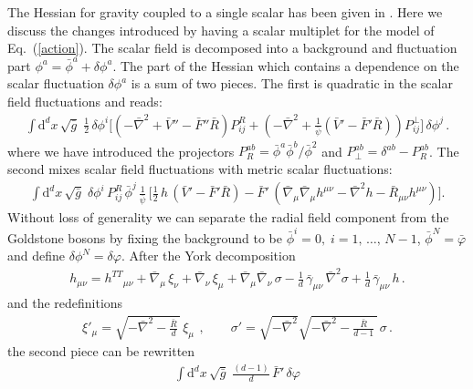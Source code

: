 \documentclass[11pt]{book} %
\newcommand{\bg}{\bar \gamma}
\newcommand{\bR}{\bar R}
\newcommand{\bnabla}{\bar\nabla}
\newcommand{\tth}{{h^{TT}}}
\newcommand{\bphi}{\bar\phi}
\newcommand{\rad}{\psi}
\numberwithin{equation}{chapter}
\begin{document}
{\begin{appendices}
The Hessian for gravity coupled to a single scalar has been
given in \cite{Percacci:2015wwa}.
Here we discuss the changes introduced by having a scalar multiplet for the model of Eq.~(\ref{action}).
The scalar field is decomposed into a background and
fluctuation part $\phi^a=\bar{\phi}^a+\delta\phi^a$.
The part of the Hessian which contains a dependence
on the scalar fluctuation $\delta\phi^a$ is a sum of two pieces.
The first is quadratic in the scalar field fluctuations and reads:
\begin{align}
  \int \mathrm d^d x \, \sqrt{\bar{g}} \; \frac{1}{2} \, \delta\phi^i
  \bigg[
    \left(-\bar{\nabla}^2
    +\bar V''-\bar F''\bar{R}\right) P^{R}_{ij}
    +\left(-\bar{\nabla}^2
    +\frac{1}{\bar\rad}(\bar V'-\bar F'\bar{R})\right) P^{\perp}_{ij}
  \bigg] \, \delta\phi^j \,.
\end{align}
where we have introduced the
projectors $P_R^{ab}=\bphi^a\bphi^b/\bphi^2$
and $P_\perp^{ab} =\delta^{ab}-P_R^{ab}$.
The second mixes scalar field fluctuations with metric scalar fluctuations:
\begin{align}
  \int \mathrm d^d x \, \sqrt{\bar{g}} \;
  \delta\phi^i \, P^{R}_{ij} \, \bar{\phi}^j \,
  \frac{1}{\bar\rad} \,
  \bigg[
    \frac{1}{2} \, h \, (\bar V'-\bar F'\bR)
    - \bar F' \, (\bar \nabla_\mu\bar \nabla_\mu h^{\mu\nu} - \bar{\nabla}^2 h - \bar{R}_{\mu\nu} h^{\mu\nu})
  \bigg] .
\end{align}
Without loss of generality we can separate the radial field component from the Goldstone bosons
by fixing the background to be
$\bar{\phi}^i = 0,\; i=1,\, \dots,\, N-1$, $\bar{\phi}^N = \bar{\varphi}$
and define $\delta\phi^N = \delta \varphi$.
After the York decomposition
\begin{align}
  h_{\mu\nu} = \tth_{\!\!\mu\nu}
             + \bnabla_\mu \, \xi_\nu
             + \bnabla_\nu \, \xi_\mu
             + \bnabla_\mu \bnabla_\nu \, \sigma
             - \frac{1}{d} \, \bg_{\mu\nu} \, \bnabla^2\sigma
             + \frac{1}{d} \, \bg_{\mu\nu} \, h \,.
  \label{york}
\end{align}
and the redefinitions
\begin{align}
  \xi'_\mu = \sqrt{-\bar\nabla^2-\frac{\bar R}{d} \, } \, \xi_\mu\ \,,\qquad
  \sigma'  = \sqrt{-\bar\nabla^2}\sqrt{-\bar\nabla^2-\frac{\bar R}{d-1} \, } \, \sigma \,.
  \label{redef}
\end{align}
the second piece can be rewritten
\begin{align}
  \int \mathrm{d}^d x \, \sqrt{\bar{g}} \;
  \frac{(d-1)}{d} \, \bar F' \, \delta\varphi

\end{align}
\end{appendices}}
\end{document}
